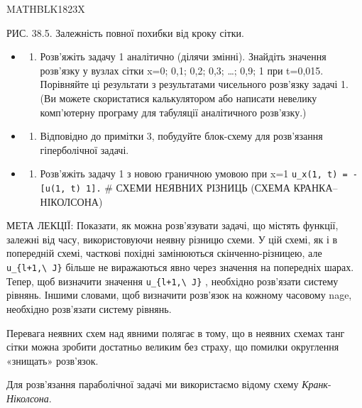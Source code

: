 \documentclass[
  ukrainian,
]{article}
\providecommand{\tightlist}{%
  \setlength{\itemsep}{0pt}\setlength{\parskip}{0pt}}
\begin{document}
MATHBLK1823X

РИС. 38.5. Залежність повної похибки від кроку сітки.

\begin{itemize}
\tightlist
\item
  \begin{enumerate}
  \def\labelenumi{\arabic{enumi}.}
  \setcounter{enumi}{1}
  \tightlist
  \item
    Розв'яжіть задачу 1 аналітично (ділячи змінні). Знайдіть значення
    розв'язку у вузлах сітки x=0; 0,1; 0,2; 0,3; \ldots; 0,9; 1 при
    t=0,015. Порівняйте ці результати з результатами чисельного
    розв'язку задачі 1. (Ви можете скористатися калькулятором або
    написати невелику комп'ютерну програму для табуляції аналітичного
    розв'язку.)
  \end{enumerate}
\item
  \begin{enumerate}
  \def\labelenumi{\arabic{enumi}.}
  \setcounter{enumi}{2}
  \tightlist
  \item
    Відповідно до примітки 3, побудуйте блок-схему для розв'язання
    гіперболічної задачі.
  \end{enumerate}
\item
  \begin{enumerate}
  \def\labelenumi{\arabic{enumi}.}
  \setcounter{enumi}{3}
  \tightlist
  \item
    Розв'яжіть задачу 1 з новою граничною умовою при x=1
    \texttt{u\_x(1,\ t)\ =\ -{[}u(1,\ t)\ 1{]}.} \# СХЕМИ НЕЯВНИХ
    РІЗНИЦЬ (СХЕМА КРАНКА--НІКОЛСОНА)
  \end{enumerate}
\end{itemize}

МЕТА ЛЕКЦІЇ: Показати, як можна розв'язувати задачі, що містять функції,
залежні від часу, використовуючи неявну різницю схеми. У цій схемі, як і
в попередній схемі, часткові похідні замінюються скінченно-різницею, але
\texttt{u\_\{l+1,\textbackslash{}\ J\}} більше не виражаються явно через
значення на попередніх шарах. Тепер, щоб визначити значення
\texttt{u\_\{l+1,\textbackslash{}\ J\}} , необхідно розв'язати систему
рівнянь. Іншими словами, щоб визначити розв'язок на кожному часовому
nage, необхідно розв'язати систему рівнянь.

Перевага неявних схем над явними полягає в тому, що в неявних схемах
танг сітки можна зробити достатньо великим без страху, що помилки
округлення «знищать» розв'язок.

Для розв'язання параболічної задачі ми використаємо відому схему
\emph{Кранк}-\emph{Ніколсона}.
\end{document}
